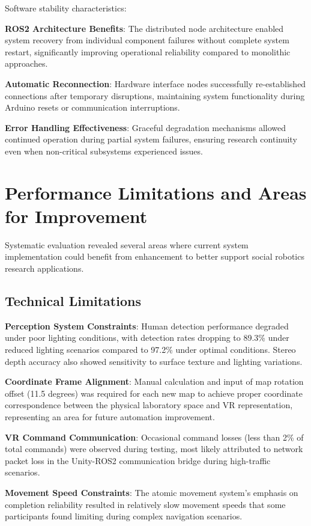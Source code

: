 Software stability characteristics:

\textbf{ROS2 Architecture Benefits}: The distributed node architecture enabled system recovery from individual component failures without complete system restart, significantly improving operational reliability compared to monolithic approaches.

\textbf{Automatic Reconnection}: Hardware interface nodes successfully re-established connections after temporary disruptions, maintaining system functionality during Arduino resets or communication interruptions.

\textbf{Error Handling Effectiveness}: Graceful degradation mechanisms allowed continued operation during partial system failures, ensuring research continuity even when non-critical subsystems experienced issues.

\section{Performance Limitations and Areas for Improvement}
\label{sec:limitations}

Systematic evaluation revealed several areas where current system implementation could benefit from enhancement to better support social robotics research applications.

\subsection{Technical Limitations}

\textbf{Perception System Constraints}: Human detection performance degraded under poor lighting conditions, with detection rates dropping to 89.3\% under reduced lighting scenarios compared to 97.2\% under optimal conditions. Stereo depth accuracy also showed sensitivity to surface texture and lighting variations.

\textbf{Coordinate Frame Alignment}: Manual calculation and input of map rotation offset (11.5 degrees) was required for each new map to achieve proper coordinate correspondence between the physical laboratory space and VR representation, representing an area for future automation improvement.

\textbf{VR Command Communication}: Occasional command losses (less than 2\% of total commands) were observed during testing, most likely attributed to network packet loss in the Unity-ROS2 communication bridge during high-traffic scenarios.

\textbf{Movement Speed Constraints}: The atomic movement system's emphasis on completion reliability resulted in relatively slow movement speeds that some participants found limiting during complex navigation scenarios.



